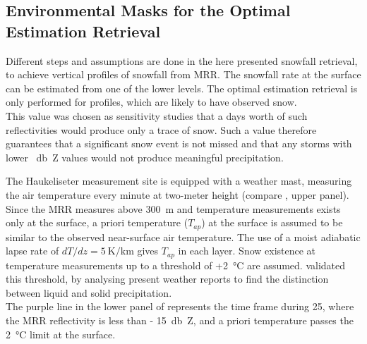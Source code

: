 \subsection{Environmental Masks for the Optimal Estimation Retrieval}\label{sec:pre_snow}
Different steps and assumptions are done in the here presented snowfall retrieval, to achieve vertical profiles of snowfall from MRR. The snowfall rate at the surface can be estimated from one of the lower levels. The optimal estimation retrieval is only performed for profiles, which are likely to have observed snow. 
\\
This value was  chosen as sensitivity studies \citep[e.g.][]{wood_level_2013} that a days worth of such reflectivities would produce only a trace of snow.  Such a value therefore guarantees that a significant snow event is not missed and that any storms with lower \SI{}{\decibel Z} values would not produce meaningful precipitation.

\noindent
The Haukeliseter measurement site is equipped with a weather mast, measuring the air temperature every minute at two-meter height (compare , upper panel). 
%
Since the MRR measures above \SI{300}{\metre} and temperature measurements exists only at the surface, a priori temperature ($T_{ap}$) at the surface is assumed to be similar to the observed near-surface air temperature. The use of a moist adiabatic lapse rate of $dT/dz = \SI{5}{\kelvin\per\km}$ gives $T_{ap}$ in each layer. 
Snow existence at temperature measurements up to a threshold of +\SI{2}{\celsius} are assumed. \citet{liu_g._deriving_2008} validated this threshold, by analysing present weather reports to find the distinction between liquid and solid precipitation.\\
The purple line in the lower panel of  represents the time frame during \SI{25}{\dec}, where the MRR reflectivity is less than \SI{- 15}{\decibel Z}, and a priori temperature passes the \SI{2}{\celsius} limit at the surface.  
